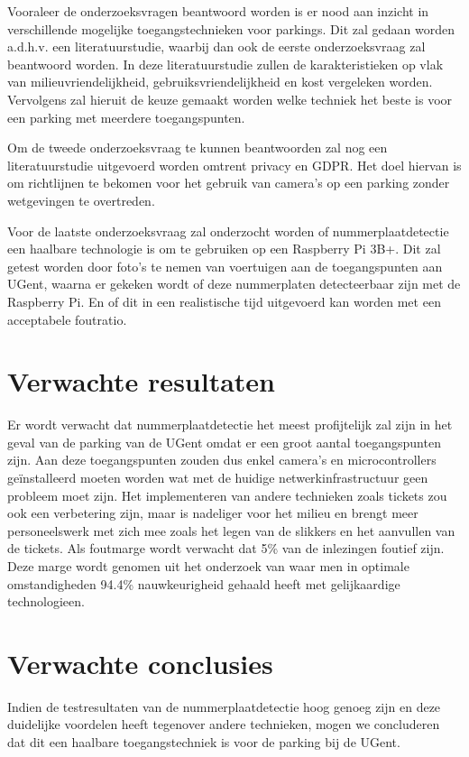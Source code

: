 Vooraleer de onderzoeksvragen beantwoord worden is er nood aan inzicht in verschillende mogelijke toegangstechnieken voor parkings. Dit zal gedaan worden a.d.h.v. een literatuurstudie, waarbij dan ook de eerste onderzoeksvraag zal beantwoord worden. In deze literatuurstudie zullen de karakteristieken op vlak van milieuvriendelijkheid, gebruiksvriendelijkheid en kost vergeleken worden. Vervolgens zal hieruit de keuze gemaakt worden welke techniek het beste is voor een parking met meerdere toegangspunten.

Om de tweede onderzoeksvraag te kunnen beantwoorden zal nog een literatuurstudie uitgevoerd worden omtrent privacy en GDPR. Het doel hiervan is om richtlijnen te bekomen voor het gebruik van camera’s op een parking zonder wetgevingen te overtreden.

Voor de laatste onderzoeksvraag zal onderzocht worden of nummerplaatdetectie een haalbare technologie is om te gebruiken op een Raspberry Pi 3B+. Dit zal getest worden door foto’s te nemen van voertuigen aan de toegangspunten aan UGent, waarna er gekeken wordt of deze nummerplaten detecteerbaar zijn met de Raspberry Pi. En of dit in een realistische tijd uitgevoerd kan worden met een acceptabele foutratio.

\section{Verwachte resultaten}
\label{sec:verwachte_resultaten}
Er wordt verwacht dat nummerplaatdetectie het meest profijtelijk zal zijn in het geval van de parking van de UGent omdat er een groot aantal toegangspunten zijn. Aan deze toegangspunten zouden dus enkel camera’s en microcontrollers geïnstalleerd moeten worden wat met de huidige netwerkinfrastructuur geen probleem moet zijn. Het implementeren van andere technieken zoals tickets zou ook een verbetering zijn, maar is nadeliger voor het milieu en brengt meer personeelswerk met zich mee zoals het legen van de slikkers en het aanvullen van de tickets. Als foutmarge wordt verwacht dat 5\% van de inlezingen foutief zijn. Deze marge wordt genomen uit het onderzoek van \textcite{figuerola2016automated} waar men in optimale omstandigheden 94.4\% nauwkeurigheid gehaald heeft met gelijkaardige technologieen.

\section{Verwachte conclusies}
\label{sec:verwachte_conclusies}

Indien de testresultaten van de nummerplaatdetectie hoog genoeg zijn en deze duidelijke voordelen heeft tegenover andere technieken, mogen we concluderen dat dit een haalbare toegangstechniek is voor de parking bij de UGent.